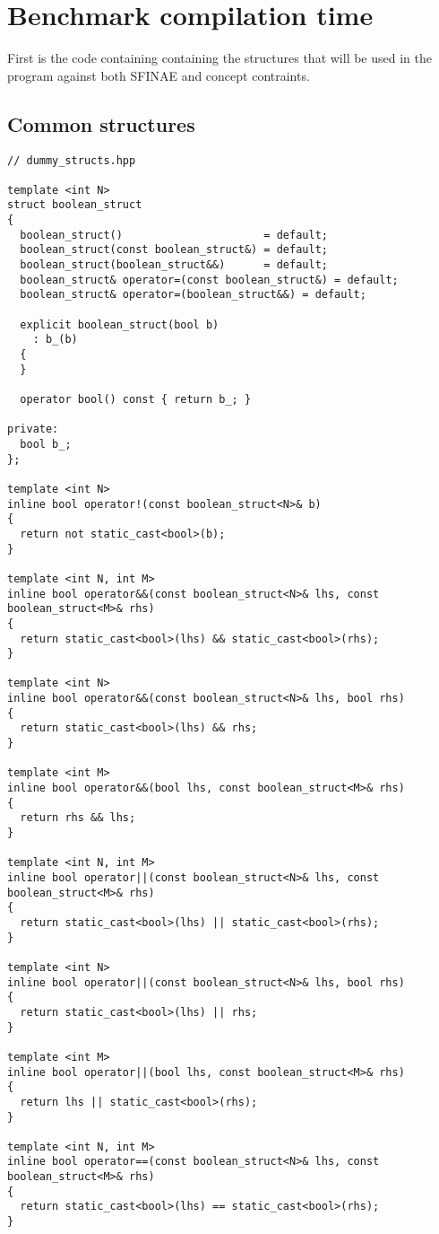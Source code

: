 \chapter{Benchmark compilation time}
\label{appendix.benchmark_compilation_time}

First is the code containing containing the structures that will be used in the program against both SFINAE and concept
contraints.
\section{Common structures}
\begin{verbatim}
// dummy_structs.hpp

template <int N>
struct boolean_struct
{
  boolean_struct()                      = default;
  boolean_struct(const boolean_struct&) = default;
  boolean_struct(boolean_struct&&)      = default;
  boolean_struct& operator=(const boolean_struct&) = default;
  boolean_struct& operator=(boolean_struct&&) = default;

  explicit boolean_struct(bool b)
    : b_(b)
  {
  }

  operator bool() const { return b_; }

private:
  bool b_;
};

template <int N>
inline bool operator!(const boolean_struct<N>& b)
{
  return not static_cast<bool>(b);
}

template <int N, int M>
inline bool operator&&(const boolean_struct<N>& lhs, const boolean_struct<M>& rhs)
{
  return static_cast<bool>(lhs) && static_cast<bool>(rhs);
}

template <int N>
inline bool operator&&(const boolean_struct<N>& lhs, bool rhs)
{
  return static_cast<bool>(lhs) && rhs;
}

template <int M>
inline bool operator&&(bool lhs, const boolean_struct<M>& rhs)
{
  return rhs && lhs;
}

template <int N, int M>
inline bool operator||(const boolean_struct<N>& lhs, const boolean_struct<M>& rhs)
{
  return static_cast<bool>(lhs) || static_cast<bool>(rhs);
}

template <int N>
inline bool operator||(const boolean_struct<N>& lhs, bool rhs)
{
  return static_cast<bool>(lhs) || rhs;
}

template <int M>
inline bool operator||(bool lhs, const boolean_struct<M>& rhs)
{
  return lhs || static_cast<bool>(rhs);
}

template <int N, int M>
inline bool operator==(const boolean_struct<N>& lhs, const boolean_struct<M>& rhs)
{
  return static_cast<bool>(lhs) == static_cast<bool>(rhs);
}


\end{verbatim}
